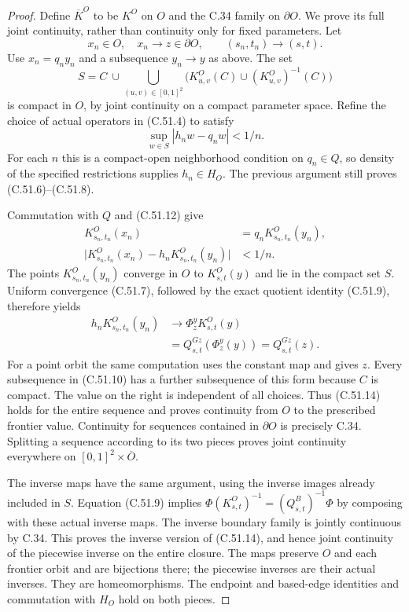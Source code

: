 \begin{proof}
Define $\overline K^O$ to be $K^O$ on $O$ and
the C.34 family on $\partial O$. We prove its full
joint continuity, rather than continuity only for
fixed parameters. Let
\[
       x_n\in O,\quad x_n\to z\in\partial O,
       \qquad(s_n,t_n)\to(s,t).
                                                        \tag{C.51.10}
\]
Use $x_n=q_ny_n$ and a subsequence $y_n\to y$ as
above. The set
\[
 S=C\ \cup\!\bigcup_{(u,v)\in[0,1]^2}
                    \bigl(K^O_{u,v}(C)\cup(K^O_{u,v})^{-1}(C)\bigr)
                                                        \tag{C.51.11}
\]
is compact in $O$, by joint continuity on a compact
parameter space. Refine the choice of actual operators
in (C.51.4) to satisfy
\[
                       \sup_{w\in S}|h_nw-q_nw|<1/n.
                                                        \tag{C.51.12}
\]
For each $n$ this is a compact-open neighborhood
condition on $q_n\in Q$, so density of the specified
restrictions supplies $h_n\in H_O$.
The previous argument still proves (C.51.6)--(C.51.8).

Commutation with $Q$ and (C.51.12) give
\[
 \begin{split}
 K^O_{s_n,t_n}(x_n)&=q_nK^O_{s_n,t_n}(y_n),\\
 \bigl|K^O_{s_n,t_n}(x_n)
            -h_nK^O_{s_n,t_n}(y_n)\bigr|&<1/n.
 \end{split}                                            \tag{C.51.13}
\]
The points $K^O_{s_n,t_n}(y_n)$ converge in $O$ to
$K^O_{s,t}(y)$ and lie in the compact set $S$.
Uniform convergence (C.51.7), followed by the exact
quotient identity (C.51.9), therefore yields
\[
 \begin{split}
 h_nK^O_{s_n,t_n}(y_n)
      &\longrightarrow\Phi_z^y K^O_{s,t}(y)\\
      &=Q^{Gz}_{s,t}(\Phi_z^y(y))
        =Q^{Gz}_{s,t}(z).
 \end{split}                                            \tag{C.51.14}
\]
For a point orbit the same computation uses the
constant map and gives $z$.
Every subsequence in (C.51.10) has a further subsequence
of this form because $C$ is compact. The value on the
right is independent of all choices. Thus (C.51.14)
holds for the entire sequence and proves continuity
from $O$ to the prescribed frontier value.
Continuity for sequences contained in $\partial O$
is precisely C.34. Splitting a sequence according
to its two pieces proves joint continuity everywhere
on $[0,1]^2\times\overline O$.

The inverse maps have the same argument, using
the inverse images already included in $S$.
Equation (C.51.9) implies
$\Phi(K^O_{s,t})^{-1}=(Q^B_{s,t})^{-1}\Phi$
by composing with these actual inverse maps.
The inverse boundary family is jointly continuous
by C.34. This proves the inverse version of
(C.51.14), and hence joint continuity of the
piecewise inverse on the entire closure.
The maps preserve $O$ and each frontier orbit and
are bijections there; the piecewise inverses are
their actual inverses. They are homeomorphisms.
The endpoint and based-edge identities and
commutation with $H_O$ hold on both pieces.


\end{proof}
